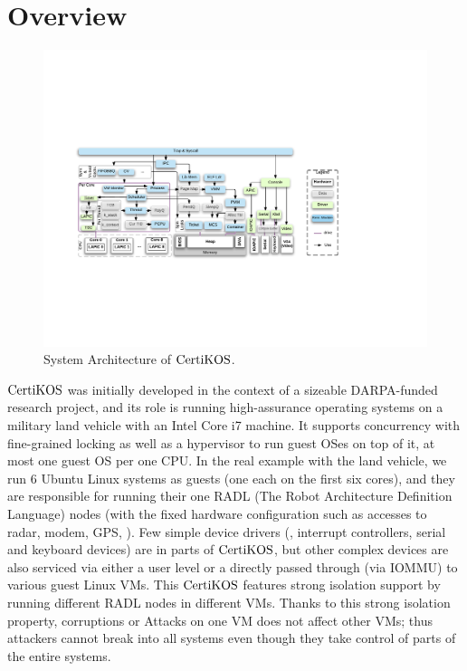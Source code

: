 \section{Overview}
\label{chapter:certikos:sec:overview}

\begin{figure}
\includegraphics[width=\textwidth]{figs/certikos/sysarch}
\caption{System Architecture of $\mathrm{CertiKOS}$.}
\label{fig:chapter:certikos:system-architecture-of-certikos}
\end{figure}

$\mathrm{CertiKOS}$ was initially developed in the context of a sizeable DARPA-funded research project,
and its role is running high-assurance operating systems on a military land vehicle with an Intel Core i7 machine. 
It supports concurrency with fine-grained locking as well as a hypervisor
to run guest OSes on top of it, 
at most one guest OS per one CPU. 
In the real example with the land vehicle, 
we run 6 Ubuntu Linux systems as guests (one each on the first six cores), 
and  they are responsible for running  their one RADL (The Robot Architecture Definition Language) nodes (with the fixed hardware configuration such as accesses to radar, modem, GPS, \etc). 
Few simple device drivers (\eg, interrupt controllers, serial and keyboard devices)  are in parts of $\mathrm{CertiKOS}$,
but other complex devices are also serviced via either a user level or a directly passed through (via IOMMU) to various guest Linux VMs. 
This $\mathrm{CertiKOS}$ features strong isolation support by running different RADL nodes in different VMs. 
Thanks to this strong isolation property, corruptions or Attacks on one VM does not affect other VMs; 
thus attackers cannot break into all systems even though they take control of parts of the entire systems.

